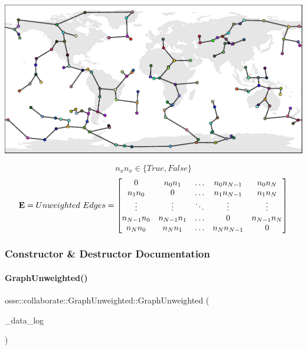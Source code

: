  
\begin{DoxyImageNoCaption}
  \mbox{\includegraphics[width=\textwidth]{prim}}
\end{DoxyImageNoCaption}


\[ n_x n_x \in \{True,False\} \] \[ {\bf{E}} = Unweighted~Edges = \begin{bmatrix} 0 & n_0 n_1 & \dots & n_0 n_{N-1} & n_0 n_N \\ n_1 n_0 & 0 & \dots & n_1 n_{N-1} & n_1 n_N \\ \vdots & \vdots & \ddots & \vdots & \vdots \\ n_{N-1} n_0 & n_{N-1} n_1 & \dots & 0 & n_{N-1} n_N \\ n_N n_0 & n_N n_1 & \dots & n_N n_{N-1} & 0 \end{bmatrix} \] 

\subsubsection{Constructor \& Destructor Documentation}
\mbox{\label{classosse_1_1collaborate_1_1_graph_unweighted_a5b5c79a90fa8a8957f98e0dc4f5bafb6}} 
\paragraph{\texorpdfstring{Graph\+Unweighted()}{GraphUnweighted()}}
{\footnotesize\ttfamily osse\+::collaborate\+::\+Graph\+Unweighted\+::\+Graph\+Unweighted (\begin{DoxyParamCaption}\item[{\hyperlink{classosse_1_1collaborate_1_1_data_logger}{Data\+Logger} $\ast$}]{\+\_\+data\+\_\+log }\end{DoxyParamCaption})\hspace{0.3cm}{\ttfamily [explicit]}}




